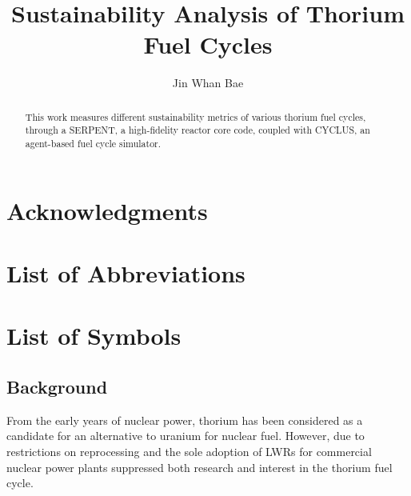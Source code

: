 \documentclass{article}
\begin{document}
\title{Sustainability Analysis of Thorium Fuel Cycles}
\author{Jin Whan Bae}


\begin{abstract}
This work measures different sustainability metrics of various
thorium fuel cycles, through a SERPENT, a high-fidelity reactor core
code, coupled with CYCLUS, an agent-based fuel cycle simulator.
\end{abstract}

\chapter*{Acknowledgments}



\tableofcontents
\listoftables
\listoffigures

\chapter{List of Abbreviations}
\printglossaries
\chapter{List of Symbols}


\pagebreak

\section{Background}
From the early years of nuclear power, thorium has been
considered as a candidate for an alternative to uranium
for nuclear fuel. However, due to restrictions on reprocessing
and the sole adoption of \glspl{LWR} for commercial nuclear
power plants suppressed both research and interest in the 
thorium fuel cycle. 
\end{document}
